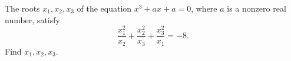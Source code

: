 The roots $x_1,x_2,x_3$ of the equation $x^3+ax+a=0$, where $a$ is a nonzero real number, satisfy
\[
\dfrac{x_1^2}{x_2}+\dfrac{x_2^2}{x_3}+\dfrac{x_3^2}{x_1}=-8 .
\]
Find $x_1,x_2,x_3$.
